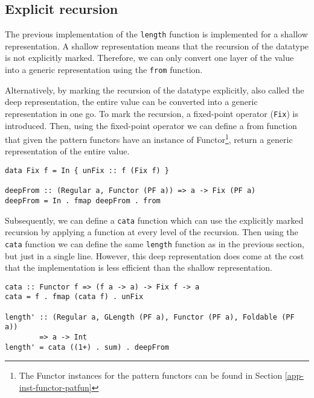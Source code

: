 \subsection{Explicit recursion}
\label{sec-explicit-recursion}


The previous implementation of the \texttt{length} function is implemented for a shallow representation. A shallow representation means that the recursion of the datatype is not explicitly marked. Therefore, we can only convert one layer of the value into a generic representation using the \texttt{from} function. 

Alternatively, by marking the recursion of the datatype explicitly, also called the deep representation, the entire value can be converted into a generic representation in one go. To mark the recursion, a fixed-point operator (\texttt{Fix}) is introduced. Then, using the fixed-point operator we can define a from function that given the pattern functors have an instance of Functor\footnote{The Functor instances for the pattern functors can be found in Section \ref{app-inst-functor-patfun}}, return a generic representation of the entire value.

\begin{verbatim}
data Fix f = In { unFix :: f (Fix f) }

deepFrom :: (Regular a, Functor (PF a)) => a -> Fix (PF a)
deepFrom = In . fmap deepFrom . from
\end{verbatim}

Subsequently, we can define a \texttt{cata} function which can use the explicitly marked recursion by applying a function at every level of the recursion. Then using the \texttt{cata} function we can define the same \texttt{length} function as in the previous section, but just in a single line. However, this deep representation does come at the cost that the implementation is less efficient than the shallow representation. 

\begin{verbatim}
cata :: Functor f => (f a -> a) -> Fix f -> a
cata = f . fmap (cata f) . unFix

length' :: (Regular a, GLength (PF a), Functor (PF a), Foldable (PF a)) 
        => a -> Int
length' = cata ((1+) . sum) . deepFrom
\end{verbatim}